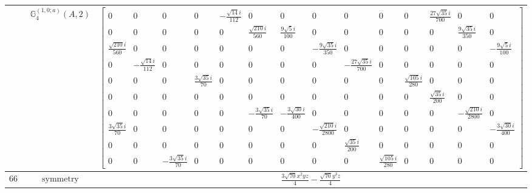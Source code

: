 \documentclass[fleqn,8pt,landscape]{jsarticle}
\begin{document}
\begin{longtable}{ccc}
$  $ & $ \mathbb{G}_{4}^{(1,0;a)}(A,2) $ & $ \begin{bmatrix} 0 & 0 & 0 & 0 & - \frac{\sqrt{14} i}{112} & 0 & 0 & 0 & 0 & 0 & 0 & \frac{27 \sqrt{35} i}{700} & 0 & 0 \\ 0 & 0 & 0 & 0 & 0 & \frac{\sqrt{210} i}{560} & \frac{9 \sqrt{5} i}{100} & 0 & 0 & 0 & 0 & 0 & \frac{9 \sqrt{35} i}{350} & 0 \\ \frac{\sqrt{210} i}{560} & 0 & 0 & 0 & 0 & 0 & 0 & - \frac{9 \sqrt{35} i}{350} & 0 & 0 & 0 & 0 & 0 & - \frac{9 \sqrt{5} i}{100} \\ 0 & - \frac{\sqrt{14} i}{112} & 0 & 0 & 0 & 0 & 0 & 0 & - \frac{27 \sqrt{35} i}{700} & 0 & 0 & 0 & 0 & 0 \\ 0 & 0 & 0 & \frac{3 \sqrt{35} i}{70} & 0 & 0 & 0 & 0 & 0 & 0 & \frac{\sqrt{105} i}{280} & 0 & 0 & 0 \\ 0 & 0 & 0 & 0 & 0 & 0 & 0 & 0 & 0 & 0 & 0 & \frac{\sqrt{35} i}{200} & 0 & 0 \\ 0 & 0 & 0 & 0 & 0 & - \frac{3 \sqrt{35} i}{70} & - \frac{3 \sqrt{30} i}{400} & 0 & 0 & 0 & 0 & 0 & - \frac{\sqrt{210} i}{2800} & 0 \\ \frac{3 \sqrt{35} i}{70} & 0 & 0 & 0 & 0 & 0 & 0 & - \frac{\sqrt{210} i}{2800} & 0 & 0 & 0 & 0 & 0 & - \frac{3 \sqrt{30} i}{400} \\ 0 & 0 & 0 & 0 & 0 & 0 & 0 & 0 & \frac{\sqrt{35} i}{200} & 0 & 0 & 0 & 0 & 0 \\ 0 & 0 & - \frac{3 \sqrt{35} i}{70} & 0 & 0 & 0 & 0 & 0 & 0 & \frac{\sqrt{105} i}{280} & 0 & 0 & 0 & 0 \end{bmatrix} $ \\ \hline
$ 667 $ & $ \text{symmetry} $ & $ \frac{3 \sqrt{70} x^{2} y z}{4} - \frac{\sqrt{70} y^{3} z}{4} $ \\

\end{longtable}
\end{document}
